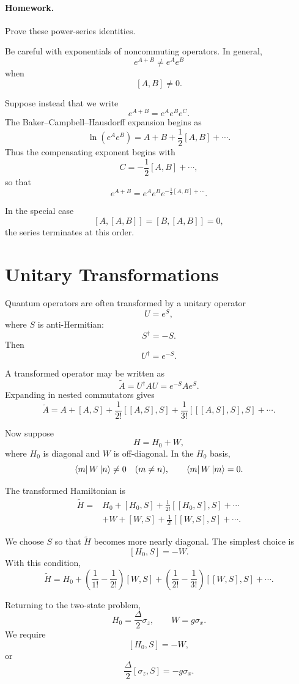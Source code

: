 \documentclass[11pt]{article}
\begin{document}
\paragraph{Homework.}
Prove these power-series identities.

Be careful with exponentials of noncommuting operators. In general,
\[
e^{A+B}\neq e^Ae^B
\]
when
\[
[A,B]\neq0.
\]

Suppose instead that we write
\[
e^{A+B}
=
e^Ae^Be^C.
\]
The Baker--Campbell--Hausdorff expansion begins as
\[
\ln(e^Ae^B)
=
A+B+\frac{1}{2}[A,B]+\cdots.
\]
Thus the compensating exponent begins with
\[
C
=
-\frac{1}{2}[A,B]+\cdots,
\]
so that
\[
e^{A+B}
=
e^Ae^B
e^{-\frac12[A,B]+\cdots}.
\]

In the special case
\[
[A,[A,B]]
=
[B,[A,B]]
=
0,
\]
the series terminates at this order.

\section{Unitary Transformations}

Quantum operators are often transformed by a unitary operator
\[
U=e^S,
\]
where $S$ is anti-Hermitian:
\[
S^\dagger=-S.
\]
Then
\[
U^\dagger=e^{-S}.
\]

A transformed operator may be written as
\[
\widetilde A
=
U^\dagger A U
=
e^{-S}Ae^S.
\]
Expanding in nested commutators gives
\[
\widetilde A
=
A
+
[A,S]
+
\frac{1}{2!}[[A,S],S]
+
\frac{1}{3!}[[[A,S],S],S]
+\cdots.
\]

Now suppose
\[
H=H_0+W,
\]
where $H_0$ is diagonal and $W$ is off-diagonal. In the $H_0$ basis,
\[
\bra{m}W\ket{n}\neq0
\quad (m\neq n),
\qquad
\bra{m}W\ket{m}=0.
\]

The transformed Hamiltonian is
\begin{align*}
\widetilde H
={}&
H_0
+
[H_0,S]
+
\frac{1}{2!}[[H_0,S],S]
+\cdots
\\
&+
W
+
[W,S]
+
\frac{1}{2!}[[W,S],S]
+\cdots.
\end{align*}

We choose $S$ so that $\widetilde H$ becomes more nearly diagonal. The simplest
choice is
\[
\boxed{
[H_0,S]=-W
}.
\]
With this condition,
\[
\widetilde H
=
H_0
+
\left(
\frac{1}{1!}-\frac{1}{2!}
\right)[W,S]
+
\left(
\frac{1}{2!}-\frac{1}{3!}
\right)[[W,S],S]
+\cdots.
\]

Returning to the two-state problem,
\[
H_0
=
\frac{\Delta}{2}\sigma_z,
\qquad
W=g\sigma_x.
\]
We require
\[
[H_0,S]=-W,
\]
or
\[
\frac{\Delta}{2}
[\sigma_z,S]
=
-g\sigma_x.
\]
\end{document}
